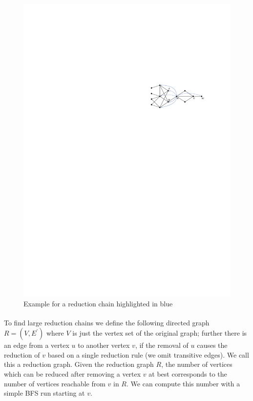 \documentclass[12pt,a4paper,twoside]{scrartcl}
\numberwithin{equation}{section}
\begin{document}
\begin{figure}[htb]
	\captionsetup{belowskip=-1em}
	\includegraphics[scale=1.5]{images/chain_red}
	\centering
	\caption{Example for a reduction chain highlighted in blue}
	\label{fig:chain_red}
\end{figure}

\paragraph{}
To find large reduction chains we define the following directed graph $R=(V, E^\prime)$ where $V$ is just the vertex set of the original graph; further there is an edge from a vertex $u$ to another vertex $v$, if the removal of $u$ causes the reduction of $v$ based on a single reduction rule (we omit transitive edges). We call this a reduction graph. Given the reduction graph $R$, the number of vertices which can be reduced after removing a vertex $v$ at best corresponds to the number of vertices reachable from $v$ in $R$. We can compute this number with a simple BFS run starting at $v$.
\end{document}
